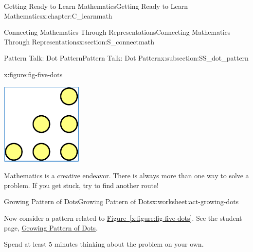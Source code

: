 \documentclass[oneside,10pt,]{book}
\newcommand{\xreffont}{\relax}
\numberwithin{equation}{chapter}
\begin{document}
\begin{chapterptx}{Getting Ready to Learn Mathematics}{}{Getting Ready to Learn Mathematics}{}{}{x:chapter:C_learnmath}
\begin{sectionptx}{Connecting Mathematics Through Representations}{}{Connecting Mathematics Through Representations}{}{}{x:section:S_connectmath}
\begin{subsectionptx}{Pattern Talk: Dot Pattern}{}{Pattern Talk: Dot Pattern}{}{}{x:subsection:SS_dot_pattern}
\begin{figureptx}{}{x:figure:fig-five-dots}{}
\begin{sidebyside}{5}{0.015}{0.015}{0.03}
\begin{sbspanel}{0.17}
\end{sbspanel}%
\begin{sbspanel}{0.17}%
\includegraphics[width=\linewidth]{external/tri-dots.pdf}
\end{sbspanel}%
\end{sidebyside}%
\tcblower
\end{figureptx}%
Mathematics is a creative endeavor. There is always more than one way to solve a problem. If you get stuck, try to find another route!%
\end{subsectionptx}
%
%
\typeout{************************************************}
\typeout{************************************************}
%
\begin{worksheet-subsection}{Growing Pattern of Dots}{}{Growing Pattern of Dots}{}{}{x:worksheet:act-growing-dots}
\begin{introduction}{}%
Now consider a pattern related to \hyperref[x:figure:fig-five-dots]{Figure~{\xreffont\ref{x:figure:fig-five-dots}}}. See the student page, \hyperref[x:worksheet:act-growing-dots]{Growing Pattern of Dots}.%
\par
Spend at least 5 minutes thinking about the problem on your own.%
\par

\end{introduction}
\end{worksheet-subsection}
\end{sectionptx}
\end{chapterptx}
\end{document}
